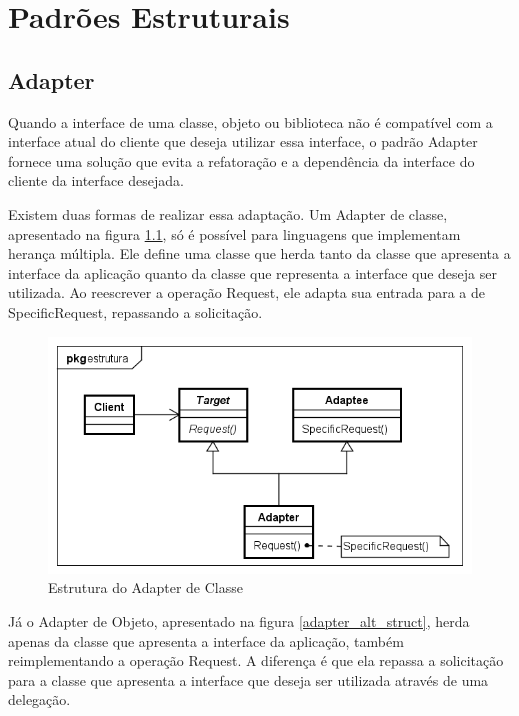 \chapter{Padrões Estruturais}

\section{Adapter}

Quando a interface de uma classe, objeto ou biblioteca não 
é compatível com a interface atual do cliente que deseja 
utilizar essa interface, o padrão Adapter fornece uma 
solução que evita a refatoração e a dependência da interface 
do cliente da interface desejada.

Existem duas formas de realizar essa adaptação. Um Adapter 
de classe, apresentado na figura \ref{adapter_struct},  
só é possível para linguagens que implementam herança múltipla.
Ele define uma classe que herda tanto da classe que 
apresenta a interface da aplicação quanto da classe que 
representa a interface que deseja ser utilizada. Ao 
reescrever a operação Request, ele adapta sua entrada 
para a de SpecificRequest, repassando a solicitação.

\begin{figure}[htb]
	\caption{\label{adapter_struct}Estrutura do Adapter de Classe}
	\begin{center}
	    \includegraphics[scale=0.5]{5_padroes-contexto-funcional/5.2_estruturais/5.2.1_adapter/adapter_classe_estrutura.png}
	\end{center}
\end{figure}

Já o Adapter de Objeto, apresentado na figura \ref{adapter_alt_struct}, 
herda apenas da classe que apresenta a interface 
da aplicação, também reimplementando a operação Request. 
A diferença é que ela repassa a solicitação para a 
classe que apresenta a interface que deseja ser 
utilizada através de uma delegação.

